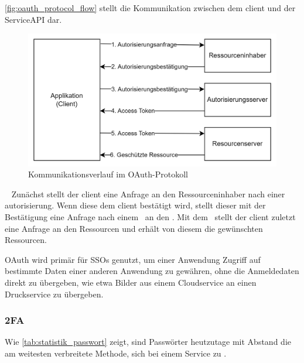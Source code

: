\autoref{fig:oauth_protocol_flow}\autocite[\vglf][, Abbildung 1]{rfc6749} stellt die Kommunikation zwischen dem \gls{client} und der Service\nonbreakdash\ac{API} dar.
\begin{figure}[htbp]
    \centering
    \includegraphics[width=\linewidth]{abbildungen/OAuth_abstract_flow}
    \caption[Kommunikationsverlauf im OAuth-Protokoll]{Kommunikationsverlauf im OAuth-Protokoll\footnotemark}
    \label{fig:oauth_protocol_flow}
\end{figure}\ 
Zunächst stellt der \gls{client} eine Anfrage an den Ressourceninhaber nach einer \gls{autorisierung}.
Wenn diese dem \gls{client} bestätigt wird, stellt dieser mit der Bestätigung eine Anfrage nach einem\  an den .
Mit dem\  stellt der \gls{client} zuletzt eine Anfrage an den Ressourcen und erhält von diesem die gewünschten Ressourcen.

OAuth wird primär für \acp{SSO} genutzt, um \zb einer Anwendung Zugriff auf bestimmte Daten einer anderen Anwendung zu gewähren, ohne die Anmeldedaten direkt zu übergeben, wie etwa Bilder aus einem Cloudservice an einen Druckservice zu übergeben.\autocite[\vglf][]{OAuthWebProtocol:2012}

\subsubsection[2-Faktor-Authentifizierung]{\acf{2FA}}\label{subsubsec:2fa}
Wie \autoref{tab:statistik_passwort}\autocite{statista-authentifizierung} zeigt, sind Passwörter heutzutage mit Abstand die am weitesten verbreitete Methode, sich bei einem Service zu .


